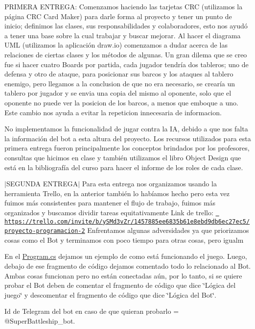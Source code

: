 PRIMERA ENTREGA\+: Comenzamos haciendo las tarjetas CRC (utilizamos la página CRC Card Maker) para darle forma al proyecto y tener un punto de inicio; definimos las clases, sus responsabilidades y colaboradores, esto nos ayudó a tener una base sobre la cual trabajar y buscar mejorar. Al hacer el diagrama UML (utilizamos la aplicación draw.\+io) comenzamos a dudar acerca de las relaciones de ciertas clases y los métodos de algunas. Un gran dilema que se creo fue si hacer cuatro Boards por partida, cada jugador tendría dos tableros; uno de defensa y otro de ataque, para posicionar sus barcos y los ataques al tablero enemigo, pero llegamos a la conclusion de que no era necesario, se crearía un tablero por jugador y se envia una copia del mismo al oponente, solo que el oponente no puede ver la posicion de los barcos, a menos que emboque a uno. Este cambio nos ayuda a evitar la repeticion innecesaria de informacion.

No implementamos la funcionalidad de jugar contra la IA, debido a que nos falta la información del bot a esta altura del proyecto. Los recursos utilizados para esta primera entrega fueron principalmente los conceptos brindados por los profesores, consultas que hicimos en clase y también utilizamos el libro Object Design que está en la bibliografía del curso para hacer el informe de los roles de cada clase.

$\vert$\+SEGUNDA ENTREGA$\vert$ Para esta entrega nos organizamos usando la herramienta Trello, en la anterior también lo habíamos hecho pero esta vez fuimos más consistentes para mantener el flujo de trabajo, fuimos más organizados y buscamos dividir tareas equitativamente Link de trello\+: \href{https://trello.com/invite/b/ySMd3vZr/1457885ee6835b61e8ebd9db6ec27ec5/proyecto-programacion-2}{\texttt{ https\+://trello.\+com/invite/b/y\+SMd3v\+Zr/1457885ee6835b61e8ebd9db6ec27ec5/proyecto-\/programacion-\/2}} Enfrentamos algunas adversidades ya que priorizamos cosas como el Bot y terminamos con poco tiempo para otras cosas, pero igualm

En el \mbox{\hyperlink{_program_8cs}{Program.\+cs}} dejamos un ejemplo de como está funcionando el juego. Luego, debajo de ese fragmento de código dejamos comentado todo lo relacionado al Bot. Ambas cosas funcionan pero no están conectadas aún, por lo tanto, si se quiere probar el Bot deben de comentar el fragmento de código que dice \char`\"{}\+Lógica del juego\char`\"{} y descomentar el fragmento de código que dice \char`\"{}\+Lógica del Bot\char`\"{}.

Id de Telegram del bot en caso de que quieran probarlo = @\+Super\+Battleship\+\_\+bot. 